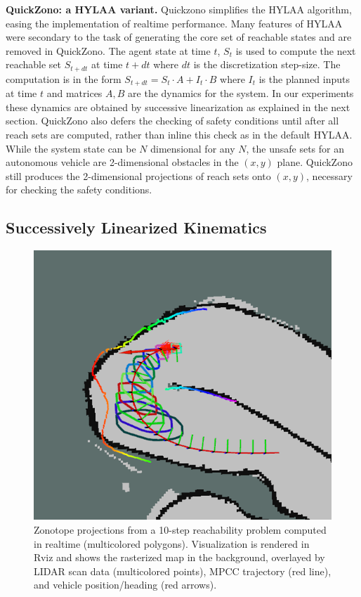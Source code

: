 \documentclass[runningheads]{llncs}
\begin{document}
\textbf{QuickZono: a HYLAA variant.}
Quickzono simplifies the HYLAA algorithm, easing the implementation of realtime performance. 
Many features of HYLAA were secondary to the task of generating the core set of reachable states and are removed in QuickZono.
The agent state at time $t$, $S_t$ is used to compute the next reachable set $S_{t+dt}$ at time $t + dt$ where $dt$ is the discretization step-size. The computation is in the form $S_{t+dt} = S_t \cdot A + I_t \cdot B$ where $I_t$ is the planned inputs at time $t$ and matrices $A, B$ are the dynamics for the system. 
In our experiments these dynamics are obtained by successive linearization as explained in the next section.
QuickZono also defers the checking of safety conditions until after all reach sets are computed, rather than inline this check as in the default HYLAA.
While the system state can be $N$ dimensional for any $N$, the unsafe sets for an autonomous vehicle are 2-dimensional obstacles in the $(x,y)$ plane. 
QuickZono still produces the  2-dimensional projections of reach sets onto $(x,y)$, necessary for checking the safety conditions.

\subsection{Successively Linearized Kinematics}
\begin{figure}[t]
    \centering
    \includegraphics[width=.65\textwidth]{screenshots/FinalTopCorner.png}
    \caption{Zonotope projections from a 10-step reachability problem computed in realtime (multicolored polygons). Visualization is rendered in Rviz and shows the rasterized map in the background, overlayed by LIDAR scan data (multicolored points), MPCC trajectory (red line), and vehicle position/heading (red arrows). }
    \label{fig:my_label}
\end{figure}
\end{document}

